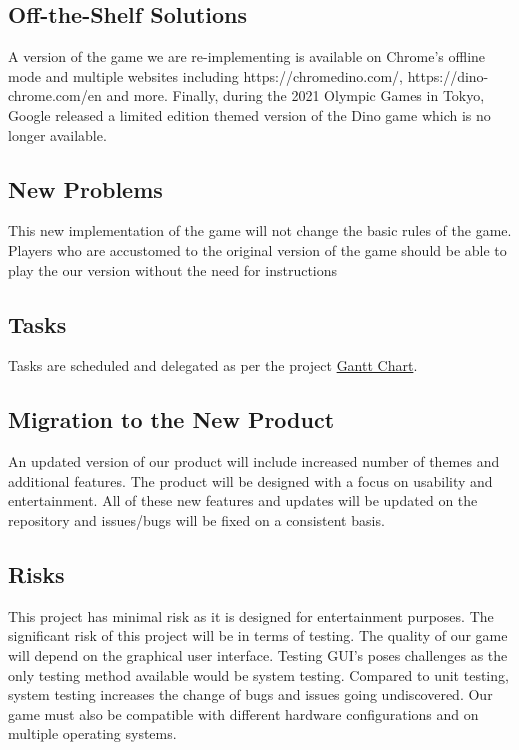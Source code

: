 \documentclass[12pt]{article}
\begin{document}
	\subsection{Off-the-Shelf Solutions}
	A version of the game we are re-implementing is available on Chrome's offline mode and multiple websites including
	https://chromedino.com/, https://dino-chrome.com/en and more.
	Finally, during the 2021 Olympic Games in Tokyo, Google released
	a limited edition themed version of the Dino game which is no longer available. 
	\subsection{New Problems}
	This new implementation of the game will not change the basic rules of the game.
	Players who are accustomed to the original version of the game should be able to play the our version without
	the need for instructions
	\subsection{Tasks}
	
	Tasks are scheduled and delegated as per the project
	\label{subsec:Tasks}
	\href{https://gitlab.cas.mcmaster.ca/maramotc/se3xa3/-/blob/main/GanttChart.pdf}{\color{blue}Gantt Chart}.
	
	\subsection{Migration to the New Product}
	An updated version of our product will include increased number of themes and additional features. The product will be designed with a focus on usability and entertainment. All of these new features and updates will be updated on the repository and issues/bugs will be fixed on a consistent basis. 
	
	\subsection{Risks}
	This project has minimal risk as it is designed for entertainment purposes. The significant risk of this project will be in terms of testing. The quality of our game will depend on the graphical user interface. Testing GUI’s poses challenges as the only testing method available would be system testing. Compared to unit testing, system testing increases the change of bugs and issues going undiscovered. Our game must also be compatible with different hardware configurations and on multiple operating systems.
\end{document}
